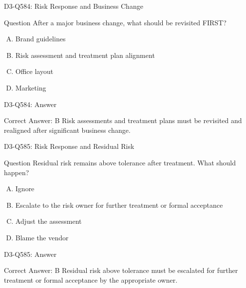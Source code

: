 \documentclass{beamer}
\begin{document}
	\begin{frame}{D3-Q584: Risk Response and Business Change}
		\begin{block}{Question}
			After a major business change, what should be revisited FIRST?
		\end{block}
		\begin{enumerate}[(A)]
			\item Brand guidelines
			\item Risk assessment and treatment plan alignment
			\item Office layout
			\item Marketing
		\end{enumerate}
	\end{frame}
	\begin{frame}{D3-Q584: Answer}
		\begin{block}{Correct Answer: B}
			Risk assessments and treatment plans must be revisited and realigned after significant business change.
		\end{block}
	\end{frame}
	
	\begin{frame}{D3-Q585: Risk Response and Residual Risk}
		\begin{block}{Question}
			Residual risk remains above tolerance after treatment. What should happen?
		\end{block}
		\begin{enumerate}[(A)]
			\item Ignore
			\item Escalate to the risk owner for further treatment or formal acceptance
			\item Adjust the assessment
			\item Blame the vendor
		\end{enumerate}
	\end{frame}
	\begin{frame}{D3-Q585: Answer}
		\begin{block}{Correct Answer: B}
			Residual risk above tolerance must be escalated for further treatment or formal acceptance by the appropriate owner.
		\end{block}
	\end{frame}
	
\end{document}
